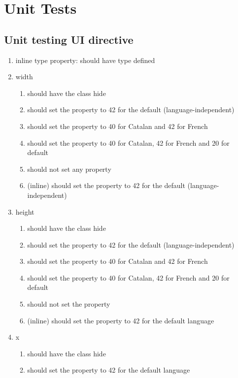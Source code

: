 \chapter{Unit Tests}
\label{chap:app-unittests}
\begin{singlespace}

\section{Unit testing UI directive}
\begin{enumerate}
\item     inline type property: should have type defined
\item     width
\begin{enumerate}
\item         should have the class hide
\item         should set the property to 42 for the default (language-independent)
\item         should set the property to 40 for Catalan and 42 for French
\item         should set the property to 40 for Catalan, 42 for French and 20 for default
\item         should not set any property
\item         (inline) should set the property to 42 for the default (language-independent)
\end{enumerate}
\item     height
\begin{enumerate}
\item         should have the class hide
\item         should set the property to 42 for the default (language-independent)
\item         should set the property to 40 for Catalan and 42 for French
\item         should set the property to 40 for Catalan, 42 for French and 20 for default
\item         should not set the property
\item         (inline) should set the property to 42 for the default language
\end{enumerate}
\item     x
\begin{enumerate}
\item         should have the class hide
\item         should set the property to 42 for the default language

\end{enumerate}
\end{enumerate}
\end{singlespace}
